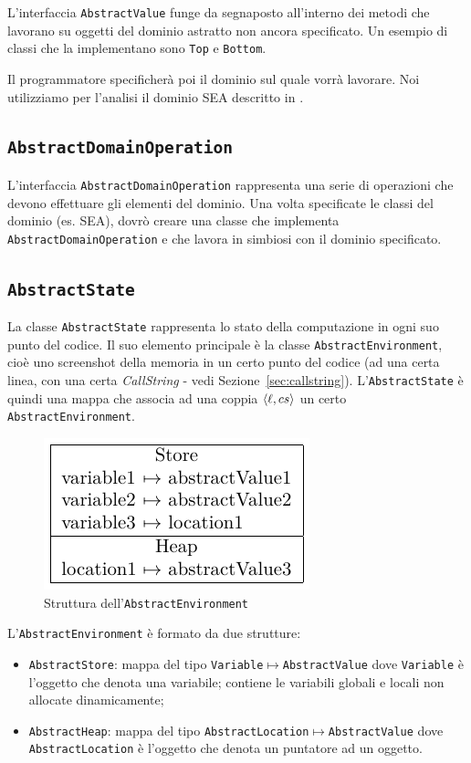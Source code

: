 L'interfaccia \texttt{AbstractValue} funge da segnaposto all'interno dei metodi che lavorano su oggetti del dominio astratto non ancora specificato. Un esempio di classi che la implementano sono \texttt{Top} e \texttt{Bottom}. 

Il programmatore specificherà poi il dominio sul quale vorrà lavorare. Noi utilizziamo per l'analisi il dominio SEA descritto in \cite{arceri}.

\subsection{\texttt{AbstractDomainOperation}}

L'interfaccia \texttt{AbstractDomainOperation} rappresenta una serie di operazioni che devono effettuare gli elementi del dominio. Una volta specificate le classi del dominio (es. SEA), dovrò creare una classe che implementa \texttt{AbstractDomainOperation} e che lavora in simbiosi con il dominio specificato.

\subsection{\texttt{AbstractState}}

La classe \texttt{AbstractState} rappresenta lo stato della computazione in ogni suo punto del codice. Il suo elemento principale è la classe \texttt{AbstractEnvironment}, cioè uno screenshot della memoria in un certo punto del codice (ad una certa linea, con una certa \emph{CallString} - vedi Sezione~\ref{sec:callstring}). L'\texttt{AbstractState} è quindi una mappa che associa ad una coppia $\langle \ell, cs \rangle$ un certo \texttt{AbstractEnvironment}.

\begin{figure}[htbp]
    \centering
    \includegraphics{scheme-generator/generated/environment.pdf}
    \caption{Struttura dell'\texttt{AbstractEnvironment}}
    \label{fig:realizzazione:abstractenvironment}
\end{figure}

L'\texttt{AbstractEnvironment} è formato da due strutture:
\begin{itemize}
    \item \texttt{AbstractStore}: mappa del tipo \texttt{Variable}$\mapsto$\texttt{AbstractValue} dove \texttt{Variable} è l'oggetto che denota una variabile; contiene le variabili globali e locali non allocate dinamicamente;
    \item \texttt{AbstractHeap}: mappa del tipo \texttt{AbstractLocation}$\mapsto$\texttt{AbstractValue} dove \texttt{AbstractLocation} è l'oggetto che denota un puntatore ad un oggetto.
\end{itemize}

